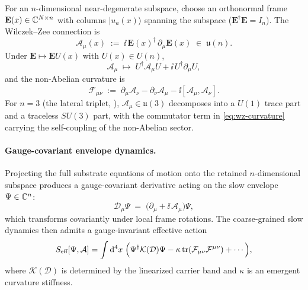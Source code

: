 For an $n$-dimensional near-degenerate subspace, choose an orthonormal frame
$\mathbf{E}(x)\in\mathbb{C}^{N\times n}$ with columns $|u_a(x)\rangle$ spanning the subspace
($\mathbf{E}^\dagger\mathbf{E}=I_n$).
The Wilczek--Zee connection is
\begin{equation}
  \mathcal{A}_\mu(x) \;:=\; \ii\,\mathbf{E}(x)^\dagger\,\partial_\mu \mathbf{E}(x)
  \;\in\; \mathfrak{u}(n).
  \label{eq:wz-connection}
\end{equation}
Under $\mathbf{E}\mapsto \mathbf{E}U(x)$ with $U(x)\in U(n)$,
\begin{equation}
  \mathcal{A}_\mu \;\mapsto\; U^\dagger \mathcal{A}_\mu U + \ii\,U^\dagger \partial_\mu U,
  \label{eq:wz-gauge}
\end{equation}
and the non-Abelian curvature is
\begin{equation}
  \mathcal{F}_{\mu\nu}
  \;:=\; \partial_\mu \mathcal{A}_\nu - \partial_\nu \mathcal{A}_\mu
    - \ii[\mathcal{A}_\mu, \mathcal{A}_\nu].
  \label{eq:wz-curvature}
\end{equation}
For $n=3$ (the lateral triplet, ), $\mathcal{A}_\mu\in\mathfrak{u}(3)$ decomposes
into a $U(1)$ trace part and a traceless $SU(3)$ part, with the commutator term in
\eqref{eq:wz-curvature} carrying the self-coupling of the non-Abelian sector.

\paragraph{Gauge-covariant envelope dynamics.}
Projecting the full substrate equations of motion onto the retained $n$-dimensional subspace produces
a gauge-covariant derivative acting on the slow envelope $\Psi\in\mathbb{C}^n$:
\begin{equation}
  \mathcal{D}_\mu \Psi \;=\; \bigl(\partial_\mu + \ii\,\mathcal{A}_\mu\bigr)\Psi,
  \label{eq:cov-deriv}
\end{equation}
which transforms covariantly under local frame rotations.
The coarse-grained slow dynamics then admits a gauge-invariant effective action
\begin{equation}
  S_{\text{eff}}[\Psi,\mathcal{A}]
  = \int \mathrm{d}^4x\;\Bigl(
    \Psi^\dagger \mathcal{K}(\mathcal{D}) \Psi
    - \kappa\,\mathrm{tr}(\mathcal{F}_{\mu\nu}\mathcal{F}^{\mu\nu})
    + \cdots
  \Bigr),
  \label{eq:Seff}
\end{equation}
where $\mathcal{K}(\mathcal{D})$ is determined by the linearized carrier band and $\kappa$ is an
emergent curvature stiffness.

